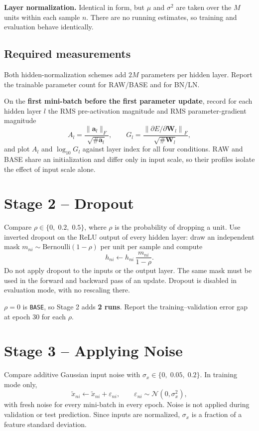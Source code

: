 \documentclass[11pt]{article}
\begin{document}
\textbf{Layer normalization.} Identical in form, but $\mu$ and $\sigma^2$ are taken over the $M$ units within each sample $n$. There are no running estimates, so training and evaluation behave identically.

\subsection*{Required measurements}
Both hidden-normalization schemes add $2M$ parameters per hidden layer. Report the trainable parameter count for RAW/BASE and for BN/LN.

On the \textbf{first mini-batch before the first parameter update}, record for each hidden layer $l$ the RMS pre-activation magnitude and RMS parameter-gradient magnitude
\[
A_l = \frac{\lVert \mathbf{a}_l\rVert_F}{\sqrt{\#\mathbf{a}_l}},
\qquad
G_l = \frac{\left\lVert \partial E/\partial \mathbf{W}_l\right\rVert_F}{\sqrt{\#\mathbf{W}_l}},
\]
and plot $A_l$ and $\log_{10}G_l$ against layer index for all four conditions. RAW and BASE share an initialization and differ only in input scale, so their profiles isolate the effect of input scale alone.

\section{Stage 2 -- Dropout}
Compare $\rho \in \{0,\;0.2,\;0.5\}$, where $\rho$ is the probability of dropping a unit. Use inverted dropout on the ReLU output of every hidden layer: draw an independent mask $m_{ni}\sim\text{Bernoulli}(1-\rho)$ per unit per sample and compute
\[
h_{ni} \leftarrow h_{ni}\,\frac{m_{ni}}{1-\rho}.
\]
Do not apply dropout to the inputs or the output layer. The same mask must be used in the forward and backward pass of an update. Dropout is disabled in evaluation mode, with no rescaling there.

$\rho=0$ is \texttt{BASE}, so Stage 2 adds \textbf{2 runs}. Report the training--validation error gap at epoch 30 for each $\rho$.

\section{Stage 3 -- Applying Noise}
Compare additive Gaussian input noise with $\sigma_x \in \{0,\;0.05,\;0.2\}$. In training mode only,
\[
\tilde{x}_{ni} \leftarrow \tilde{x}_{ni} + \varepsilon_{ni},
\qquad \varepsilon_{ni}\sim\mathcal{N}(0,\sigma_x^2),
\]
with fresh noise for every mini-batch in every epoch. Noise is not applied during validation or test prediction. Since inputs are normalized, $\sigma_x$ is a fraction of a feature standard deviation.
\end{document}
